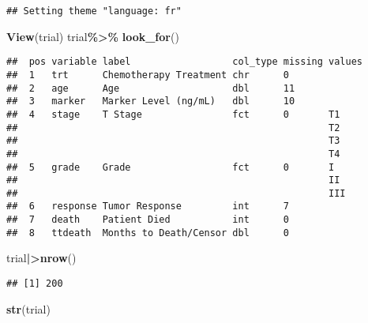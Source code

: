 \documentclass[
]{article}
\newenvironment{Shaded}{\begin{snugshade}}{\end{snugshade}}
\newcommand{\FunctionTok}[1]{\textcolor[rgb]{0.13,0.29,0.53}{\textbf{#1}}}
\newcommand{\NormalTok}[1]{#1}
\newcommand{\SpecialCharTok}[1]{\textcolor[rgb]{0.81,0.36,0.00}{\textbf{#1}}}
\begin{document}
\begin{verbatim}
## Setting theme "language: fr"
\end{verbatim}

\begin{Shaded}
\begin{Highlighting}[]
\FunctionTok{View}\NormalTok{(trial)}
\NormalTok{trial}\SpecialCharTok{\%\textgreater{}\%}
  \FunctionTok{look\_for}\NormalTok{()}
\end{Highlighting}
\end{Shaded}

\begin{verbatim}
##  pos variable label                  col_type missing values
##  1   trt      Chemotherapy Treatment chr      0             
##  2   age      Age                    dbl      11            
##  3   marker   Marker Level (ng/mL)   dbl      10            
##  4   stage    T Stage                fct      0       T1    
##                                                       T2    
##                                                       T3    
##                                                       T4    
##  5   grade    Grade                  fct      0       I     
##                                                       II    
##                                                       III   
##  6   response Tumor Response         int      7             
##  7   death    Patient Died           int      0             
##  8   ttdeath  Months to Death/Censor dbl      0
\end{verbatim}

\begin{Shaded}
\begin{Highlighting}[]
\NormalTok{trial}\SpecialCharTok{|\textgreater{}}\FunctionTok{nrow}\NormalTok{()}
\end{Highlighting}
\end{Shaded}

\begin{verbatim}
## [1] 200
\end{verbatim}

\begin{Shaded}
\begin{Highlighting}[]
\FunctionTok{str}\NormalTok{(trial)}
\end{Highlighting}
\end{Shaded}
\end{document}

